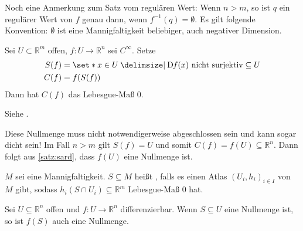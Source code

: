 Noch eine Anmerkung zum Satz vom regulären Wert: Wenn $n >m$, so ist $q$ ein regulärer Wert von $f$ genau dann, wenn $f^{-1}(q)=\emptyset$.
Es gilt folgende Konvention: $\emptyset$ ist eine Mannigfaltigkeit beliebiger, auch negativer Dimension.

\begin{satz}[{name={Sard}},label=satz:sard]
	Sei $U \subset \mathbb{R}^m$ offen, $f \colon U \to \mathbb{R}^n$ sei $C^\infty$.
	Setze
	\begin{align}
		S(f) &= \set*{x \in U \given \D f(x) \text{ nicht surjektiv}} \subseteq U \\
		C(f) &= f\enbrace*{S(f)}
	\end{align}
	Dann hat $C(f)$ das Lebesgue-Maß $0$.
\end{satz}
\begin{beweis}
	Siehe \textcite[S.~113~ff]{brocker1992analysis}.
\end{beweis}

Diese Nullmenge muss nicht notwendigerweise abgeschlossen sein und kann sogar dicht sein!
Im Fall $n>m$ gilt $S(f)=U$ und somit $C(f)=f(U)\subseteq \mathbb{R}^n$.
Dann folgt aus \cref{satz:sard}, dass $f(U)$ eine Nullmenge ist.

\begin{definition}[{name=[Nullmenge auf einer Mannigfaltigkeit]}]
	$M$ sei eine Mannigfaltigkeit.
	$S \subseteq M$ heißt , falls es einen Atlas $(U_i,h_i)_{i \in I}$ von $M$ gibt, sodass $h_i(S \cap U_i) \subseteq \mathbb{R}^m$ Lebesgue-Maß $0$ hat.
\end{definition}

\begin{satz}[{name={aus Analysis III}}]
	Sei $U \subseteq \mathbb{R}^n$ offen und $f \colon U \to \mathbb{R}^n$ differenzierbar.
	Wenn $S \subseteq U$ eine Nullmenge ist, so ist $f(S)$ auch eine Nullmenge.
\end{satz}

